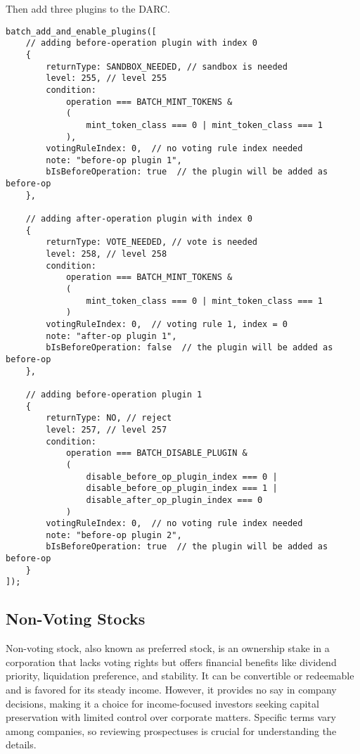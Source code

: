 \documentclass[main.tex]{subfiles}
\begin{document}
Then add three plugins to the DARC. 
\begin{verbatim}
batch_add_and_enable_plugins([
    // adding before-operation plugin with index 0
    {
        returnType: SANDBOX_NEEDED, // sandbox is needed
        level: 255, // level 255
        condition:
            operation === BATCH_MINT_TOKENS & 
            ( 
                mint_token_class === 0 | mint_token_class === 1
            ),
        votingRuleIndex: 0,  // no voting rule index needed
        note: "before-op plugin 1",
        bIsBeforeOperation: true  // the plugin will be added as before-op
    },

    // adding after-operation plugin with index 0
    {
        returnType: VOTE_NEEDED, // vote is needed
        level: 258, // level 258
        condition:
            operation === BATCH_MINT_TOKENS & 
            ( 
                mint_token_class === 0 | mint_token_class === 1
            )
        votingRuleIndex: 0,  // voting rule 1, index = 0
        note: "after-op plugin 1",
        bIsBeforeOperation: false  // the plugin will be added as before-op
    },

    // adding before-operation plugin 1
    {
        returnType: NO, // reject
        level: 257, // level 257
        condition:
            operation === BATCH_DISABLE_PLUGIN & 
            ( 
                disable_before_op_plugin_index === 0 | 
                disable_before_op_plugin_index === 1 |
                disable_after_op_plugin_index === 0
            )
        votingRuleIndex: 0,  // no voting rule index needed
        note: "before-op plugin 2",
        bIsBeforeOperation: true  // the plugin will be added as before-op
    }
]);
\end{verbatim}

\subsection{Non-Voting Stocks}

Non-voting stock, also known as preferred stock, is an ownership stake in a corporation that lacks voting rights but offers financial benefits like dividend priority, liquidation preference, and stability. It can be convertible or redeemable and is favored for its steady income. However, it provides no say in company decisions, making it a choice for income-focused investors seeking capital preservation with limited control over corporate matters. Specific terms vary among companies, so reviewing prospectuses is crucial for understanding the details.
\end{document}
